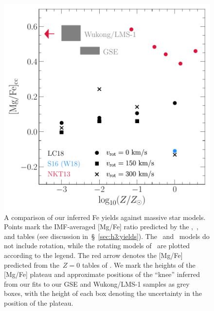 \documentclass[foo.tex]{subfiles}
\begin{document}
{%
\begin{figure}
\centering
\includegraphics[scale = 0.5]{yield-comparison.pdf}
\caption{
A comparison of our inferred Fe yields against massive star models.
Points mark the IMF-averaged [Mg/Fe] ratio predicted by the
\citet[][black]{Limongi2018},~\citet[][red]{Nomoto2013}, and
\citet[][blue]{Sukhbold2016} tables (see discussion
in~\S~\ref{sec:h3:yields}).
The~\citet{Nomoto2013} and~\citet{Sukhbold2016} models do not include rotation,
while the rotating models of~\citet{Limongi2018} are plotted according to the
legend.
The red arrow denotes the [Mg/Fe] predicted from the~$Z = 0$ tables of
\citet{Nomoto2013}.
We mark the heights of the [Mg/Fe] plateau and approximate positions of the
``knee'' inferred from our fits to our GSE and Wukong/LMS-1 samples as grey
boxes, with the height of each box denoting the uncertainty in the position
of the plateau.
%
}
\label{fig:yield-comparison}
\end{figure}

}
\end{document}
